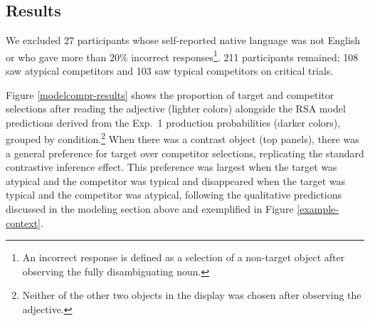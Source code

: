 \documentclass[10pt,letterpaper]{article}
\newcommand{\figref}[1]{Figure \ref{#1}}
\begin{document}

\subsection{Results}
We excluded 27 participants whose self-reported native language was not English or who gave more than 20\% incorrect responses\footnote{An incorrect response is defined as a selection of a non-target object after observing the fully disambiguating noun.}. 211 participants remained; 108 saw atypical competitors and 103 saw typical competitors on critical trials. 

\figref{modelcompr-results} shows the proportion of target and competitor selections after reading the adjective (lighter colors) alongside the RSA model predictions derived from the Exp.~1 production probabilities (darker colors), grouped by condition.\footnote{Neither of the other two objects in the display was chosen after observing the adjective.} %
When there was a contrast object (top panels), there was a general preference for target over competitor selections, replicating the standard contrastive inference effect. This preference was largest when the target was atypical and the competitor was typical and disappeared  when the target was typical and the competitor was atypical, following the qualitative predictions discussed in the modeling section above and exemplified  in \figref{example-context}. 
\end{document}
